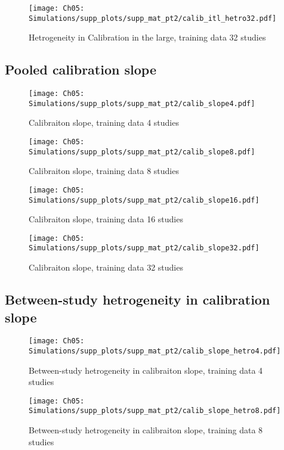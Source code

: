 \begin{figure}[H]
  \centering
  \texttt{[image: Ch05: Simulations/supp\_plots/supp\_mat\_pt2/calib\_itl\_hetro32.pdf]}
  \caption{Hetrogeneity in Calibration in the large, training data 32 studies}
\end{figure}

\subsection{Pooled calibration slope}
\begin{figure}[H]
  \centering
  \texttt{[image: Ch05: Simulations/supp\_plots/supp\_mat\_pt2/calib\_slope4.pdf]}
  \caption{Calibraiton slope, training data 4 studies}
\end{figure}

\begin{figure}[H]
  \centering
  \texttt{[image: Ch05: Simulations/supp\_plots/supp\_mat\_pt2/calib\_slope8.pdf]}
  \caption{Calibraiton slope, training data 8 studies}
\end{figure}

\begin{figure}[H]
  \centering
  \texttt{[image: Ch05: Simulations/supp\_plots/supp\_mat\_pt2/calib\_slope16.pdf]}
  \caption{Calibraiton slope, training data 16 studies}
\end{figure}

\begin{figure}[H]
  \centering
  \texttt{[image: Ch05: Simulations/supp\_plots/supp\_mat\_pt2/calib\_slope32.pdf]}
  \caption{Calibraiton slope, training data 32 studies}
\end{figure}

\subsection{Between-study hetrogeneity in calibration slope}
\begin{figure}[H]
  \centering
  \texttt{[image: Ch05: Simulations/supp\_plots/supp\_mat\_pt2/calib\_slope\_hetro4.pdf]}
  \caption{Between-study hetrogeneity in calibraiton slope, training data 4 studies}
\end{figure}

\begin{figure}[H]
  \centering
  \texttt{[image: Ch05: Simulations/supp\_plots/supp\_mat\_pt2/calib\_slope\_hetro8.pdf]}
  \caption{Between-study hetrogeneity in calibraiton slope, training data 8 studies}
\end{figure}

